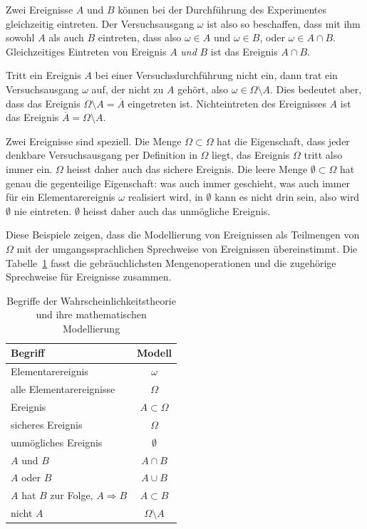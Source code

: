 Zwei Ereignisse $A$ und $B$ können bei der Durchführung des Experimentes
gleichzeitig eintreten.
Der Versuchsausgang $\omega$ ist also so beschaffen, dass mit ihm sowohl
$A$ als auch $B$ eintreten, dass also $\omega\in A$ und $\omega\in B$,
oder $\omega \in A\cap B$.
Gleichzeitiges Eintreten von Ereignis $A$ {\em und} $B$ ist das Ereignis
$A\cap B$.

Tritt ein Ereignis $A$ bei einer Versuchsdurchführung nicht ein, dann trat
ein Versuchsausgang $\omega$ auf, der nicht zu $A$ gehört,
also $\omega\in\Omega\setminus A$.
Dies bedeutet aber, dass das Ereignis $\Omega\setminus A=\overline{A}$
eingetreten ist.
Nichteintreten des Ereignisses $A$ ist das Ereignis
$\overline{A}=\Omega\setminus A$.

Zwei Ereignisse sind speziell.
Die Menge $\Omega\subset\Omega$ hat die Eigenschaft, dass jeder denkbare
Versuchsausgang per Definition in $\Omega$ liegt, das Ereignis $\Omega$
tritt also immer ein.
$\Omega$ heisst daher auch das sichere Ereignis.
Die leere Menge $\emptyset\subset\Omega$ hat genau die gegenteilige
Eigenschaft: was auch immer geschieht, was auch immer für ein 
Elementarereignis $\omega$ realisiert wird, in $\emptyset$ kann es
nicht drin sein, also wird $\emptyset$ nie eintreten.
$\emptyset$ heisst daher auch das unmögliche Ereignis.

Diese Beispiele zeigen, dass die Modellierung von Ereignissen als Teilmengen
von $\Omega$
mit der umgangssprachlichen Sprechweise von Ereignissen übereinstimmt.
Die Tabelle~\ref{begriffe-zusammenfassung}
fasst die gebräuchlichsten Mengenoperationen und die zugehörige
Sprechweise für Ereignisse zusammen.

\begin{table}
\begin{center}
\begin{tabular}{|l|c|}
\hline
Begriff&Modell\\
\hline
Elementarereignis&$\omega$\\
alle Elementarereignisse&$\Omega$\\
Ereignis&$A\subset\Omega$\\
sicheres Ereignis&$\Omega$\\
unmögliches Ereignis&$\emptyset$\\
$A$ und $B$&$A\cap B$\\
$A$ oder $B$&$A\cup B$\\
$A$ hat $B$ zur Folge, $A\Rightarrow B$&$A\subset B$\\
nicht $A$&$\Omega\setminus A$\\
\hline
\end{tabular}
\end{center}
\caption{Begriffe der Wahrscheinlichkeitstheorie und ihre mathematischen
Modellierung\label{begriffe-zusammenfassung}}
\end{table}

